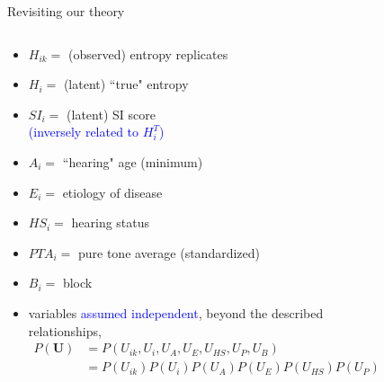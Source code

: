 %
%
\begin{frame}
	{Revisiting our theory}
	\begin{columns}
		\begin{column}{0.5\textwidth}
			\begin{itemize}
				\item $H_{ik}=$ (observed) entropy replicates
				\item $H_{i}=$ (latent) ``true" entropy
				\item $SI_{i}=$ (latent) SI score \\
				{\small \textcolor{blue}{(inversely related to $H^{T}_{i}$)} }
				\item $A_{i}=$ ``hearing" age (minimum)
				\item $E_{i}=$ etiology of disease
				\item $HS_{i}=$ hearing status
				\item $PTA_{i}=$ pure tone average (standardized)
				\item $B_{i}=$ block
				\item variables \textcolor{blue}{assumed independent}, beyond the described relationships,
				\begin{equation*}
					\begin{aligned} 
						P(\pmb{U}) & = P(U_{ik}, U_{i}, U_{A}, U_{E}, U_{HS}, U_{P}, U_{B}) \\ 
						& = P(U_{ik}) P(U_{i}) P(U_{A}) P(U_{E}) P(U_{HS}) P(U_{P}) P(U_{B})
					\end{aligned}
				\end{equation*}
			\end{itemize}
		\end{column}
		\begin{column}{0.5\textwidth}  
			\begin{figure}
\end{figure}
\end{column}
\end{columns}
\end{frame}
